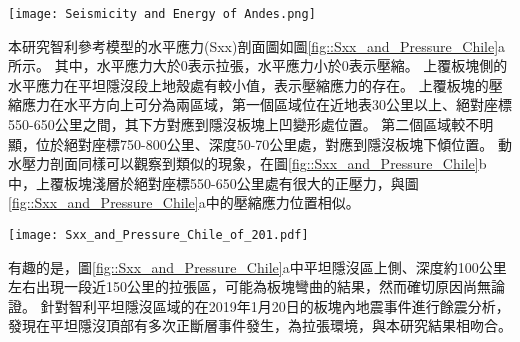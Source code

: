 \begin{figure*}[htp]
    \centering
    \texttt{[image: Seismicity and Energy of Andes.png]}
    \caption[智利沿岸自21$^\circ$S到44$^\circ$S的上板塊地震活動統計分析，摘自\citet{gutscher2002andean}]{智利沿岸自20$^\circ$S到40$^\circ$S的上板塊地震活動統計分析，摘自\citet{gutscher2002andean}。這裡採用深度<70公里的地震事件總能量，單位為10$^6$焦耳。右側數字表示1900-1963年/1964-1995年間所示分的地震能量。數字下灰色底框標示出平坦隱沒段的位置。
    }
    \label{fig::Chile_seismicity}
\end{figure*}

本研究智利參考模型的水平應力(Sxx)剖面圖如圖\ref{fig::Sxx_and_Pressure_Chile}a所示。
其中，水平應力大於0表示拉張，水平應力小於0表示壓縮。
上覆板塊側的水平應力在平坦隱沒段上地殼處有較小值，表示壓縮應力的存在。
上覆板塊的壓縮應力在水平方向上可分為兩區域，第一個區域位在近地表30公里以上、絕對座標550-650公里之間，其下方對應到隱沒板塊上凹變形處位置。
第二個區域較不明顯，位於絕對座標750-800公里、深度50-70公里處，對應到隱沒板塊下傾位置。
動水壓力剖面同樣可以觀察到類似的現象，在圖\ref{fig::Sxx_and_Pressure_Chile}b中，上覆板塊淺層於絕對座標550-650公里處有很大的正壓力，與圖\ref{fig::Sxx_and_Pressure_Chile}a中的壓縮應力位置相似。

\begin{figure*}[h]
    \centering
    \texttt{[image: Sxx\_and\_Pressure\_Chile\_of\_201.pdf]}
    \caption[智利參考模型於40 Myr的水平軸差應力與動水壓力剖面]{智利參考模型於40 Myr的水平軸差應力與動水壓力剖面，其中應力正向代表拉張應力，負向代表壓縮應力。}
    \label{fig::Sxx_and_Pressure_Chile}
\end{figure*}

有趣的是，圖\ref{fig::Sxx_and_Pressure_Chile}a中平坦隱沒區上側、深度約100公里左右出現一段近150公里的拉張區，可能為板塊彎曲的結果，然而確切原因尚無論證。
\citet{comte2023anomalous}針對智利平坦隱沒區域的在2019年1月20日的板塊內地震事件進行餘震分析，發現在平坦隱沒頂部有多次正斷層事件發生，為拉張環境，與本研究結果相吻合。

